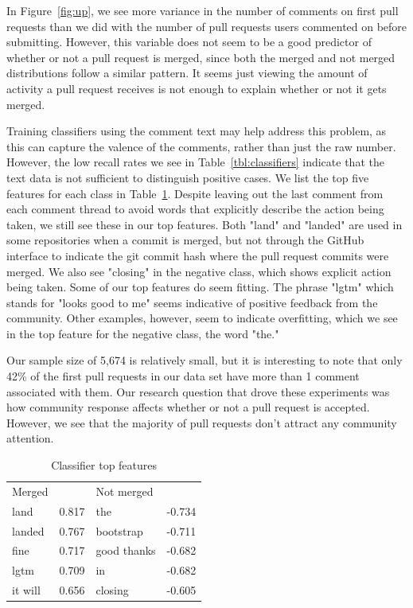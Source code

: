 \documentclass{iitthesis}
\begin{document}
In Figure~\ref{fig:up}, we see more variance in the number of comments on
first pull requests than we did with the number of pull requests users commented
on before submitting. However, this variable does not seem to be a good
predictor of whether or not a pull request is merged, since both the merged and
not merged distributions follow a similar pattern. It seems just viewing the
amount of activity a pull request receives is not enough to explain whether or
not it gets merged.

Training classifiers using the comment text may help address this problem, as
this can capture the valence of the comments, rather than just the raw number.
However, the low recall rates we see in Table~\ref{tbl:classifiers} indicate
that the text data is not sufficient to distinguish positive cases. We list the
top five features for each class in Table~\ref{tbl:features}. Despite leaving
out the last comment from each comment thread to avoid words that explicitly
describe the action being taken, we still see these in our top features. Both
"land" and "landed" are used in some repositories when a commit is merged, but
not through the GitHub interface to indicate the git commit hash where the pull
request commits were merged. We also see "closing" in the negative class, which
shows explicit action being taken. Some of our top features do seem fitting. The
phrase "lgtm" which stands for "looks good to me" seems indicative of positive
feedback from the community. Other examples, however, seem to indicate
overfitting, which we see in the top feature for the negative class, the word
"the."

Our sample size of 5,674 is relatively small, but it is interesting to note that
only 42\% of the first pull requests in our data set have more than 1 comment
associated with them. Our research question that drove these experiments was how
community response affects whether or not a pull request is accepted. However,
we see that the majority of pull requests don't attract any community attention.

\begin{table}[ht] \centering
\caption{Classifier top features}
\label{tbl:features}
\begin{tabular}{ll|ll}
\hline\hline
Merged  & ~     & Not merged  & ~      \\
land    & 0.817 & the         & -0.734 \\
landed  & 0.767 & bootstrap   & -0.711 \\
fine    & 0.717 & good thanks & -0.682 \\
lgtm    & 0.709 & in          & -0.682 \\
it will & 0.656 & closing     & -0.605 \\
\hline
\end{tabular}
\end{table}
\end{document}
